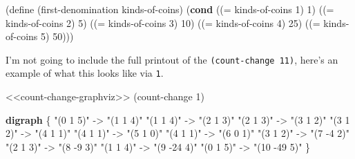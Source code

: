 \documentclass[
]{article}
\newenvironment{Shaded}{}{}
\newcommand{\CommentTok}[1]{\textcolor[rgb]{0.38,0.63,0.69}{\textit{#1}}}
\newcommand{\DecValTok}[1]{\textcolor[rgb]{0.25,0.63,0.44}{#1}}
\newcommand{\ExtensionTok}[1]{#1}
\newcommand{\FunctionTok}[1]{\textcolor[rgb]{0.02,0.16,0.49}{#1}}
\newcommand{\KeywordTok}[1]{\textcolor[rgb]{0.00,0.44,0.13}{\textbf{#1}}}
\newcommand{\NormalTok}[1]{#1}
\newcommand{\OperatorTok}[1]{\textcolor[rgb]{0.40,0.40,0.40}{#1}}
\newcommand{\OtherTok}[1]{\textcolor[rgb]{0.00,0.44,0.13}{#1}}
\newcommand{\StringTok}[1]{\textcolor[rgb]{0.25,0.44,0.63}{#1}}
\begin{document}
\begin{Shaded}
\begin{Highlighting}[numbers=left,,]
\NormalTok{(}\ExtensionTok{define}\FunctionTok{ }\NormalTok{(first{-}denomination kinds{-}of{-}coins)}
\NormalTok{  (}\KeywordTok{cond}\NormalTok{ ((}\OperatorTok{=}\NormalTok{ kinds{-}of{-}coins }\DecValTok{1}\NormalTok{) }\DecValTok{1}\NormalTok{)}
\NormalTok{        ((}\OperatorTok{=}\NormalTok{ kinds{-}of{-}coins }\DecValTok{2}\NormalTok{) }\DecValTok{5}\NormalTok{)}
\NormalTok{        ((}\OperatorTok{=}\NormalTok{ kinds{-}of{-}coins }\DecValTok{3}\NormalTok{) }\DecValTok{10}\NormalTok{)}
\NormalTok{        ((}\OperatorTok{=}\NormalTok{ kinds{-}of{-}coins }\DecValTok{4}\NormalTok{) }\DecValTok{25}\NormalTok{)}
\NormalTok{        ((}\OperatorTok{=}\NormalTok{ kinds{-}of{-}coins }\DecValTok{5}\NormalTok{) }\DecValTok{50}\NormalTok{)))}
\end{Highlighting}
\end{Shaded}

I'm not going to include the full printout of the
\texttt{(count-change\ 11)}, here's an example of what this looks like
via \texttt{1}.

\hypertarget{count-change-test}{%
\label{count-change-test}}%
\begin{Shaded}
\begin{Highlighting}[numbers=left,,]
\NormalTok{\textless{}\textless{}count{-}change{-}graphviz\textgreater{}\textgreater{}}
\NormalTok{(count{-}change }\DecValTok{1}\NormalTok{)}
\end{Highlighting}
\end{Shaded}

\begin{Shaded}
\begin{Highlighting}[]
\KeywordTok{digraph} \OtherTok{\{}
\StringTok{"(0 1 5)"}\CommentTok{ }\OtherTok{{-}\textgreater{}}\CommentTok{ }\StringTok{"(1 1 4)"}
\StringTok{"(1 1 4)"}\CommentTok{ }\OtherTok{{-}\textgreater{}}\CommentTok{ }\StringTok{"(2 1 3)"}
\StringTok{"(2 1 3)"}\CommentTok{ }\OtherTok{{-}\textgreater{}}\CommentTok{ }\StringTok{"(3 1 2)"}
\StringTok{"(3 1 2)"}\CommentTok{ }\OtherTok{{-}\textgreater{}}\CommentTok{ }\StringTok{"(4 1 1)"}
\StringTok{"(4 1 1)"}\CommentTok{ }\OtherTok{{-}\textgreater{}}\CommentTok{ }\StringTok{"(5 1 0)"}
\StringTok{"(4 1 1)"}\CommentTok{ }\OtherTok{{-}\textgreater{}}\CommentTok{ }\StringTok{"(6 0 1)"}
\StringTok{"(3 1 2)"}\CommentTok{ }\OtherTok{{-}\textgreater{}}\CommentTok{ }\StringTok{"(7 {-}4 2)"}
\StringTok{"(2 1 3)"}\CommentTok{ }\OtherTok{{-}\textgreater{}}\CommentTok{ }\StringTok{"(8 {-}9 3)"}
\StringTok{"(1 1 4)"}\CommentTok{ }\OtherTok{{-}\textgreater{}}\CommentTok{ }\StringTok{"(9 {-}24 4)"}
\StringTok{"(0 1 5)"}\CommentTok{ }\OtherTok{{-}\textgreater{}}\CommentTok{ }\StringTok{"(10 {-}49 5)"}
\OtherTok{\}}
\end{Highlighting}
\end{Shaded}
\end{document}
